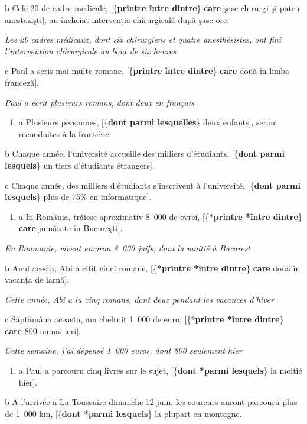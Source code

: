   b  Cele 20 de cadre medicale, [\{\textbf{printre {\textbar} între {\textbar} dintre}\} \textbf{care} şase chirurgi şi patru anestezişti], au încheiat intervenția chirurgicală după şase ore.

{\itshape
Les 20 cadres médicaux, dont six chirurgiens et quatre anesthésistes, ont fini l'intervention chirurgicale au bout de six heures}

  c  Paul a scris mai multe romane, [\{\textbf{printre {\textbar} între {\textbar} dintre}\} \textbf{care} două în limba franceză].

{\itshape
Paul a écrit plusieurs romans, dont deux en français}


\begin{enumerate}
\item \label{bkm:Ref295319097}a  Plusieurs personnes, [\{\textbf{dont {\textbar} parmi lesquelles}\} deux enfants], seront reconduites à la frontière.


\end{enumerate}
  b  Chaque année, l'université accueille des milliers d'étudiants, [\{\textbf{dont {\textbar} parmi} \textbf{lesquels}\} un tiers d'étudiants étrangers].

  c  Chaque année, des milliers d'étudiants s'inscrivent à l'université, [\{\textbf{dont {\textbar} parmi} \textbf{lesquels}\} plus de 75\% en informatique]\emph{\textup{.} }


\begin{enumerate}
\item \label{bkm:Ref295319065}a  In România, trăiesc aproximativ 8~000 de evrei, [\{\textbf{*printre {\textbar} *între {\textbar} dintre}\}\textbf{ care} jumătate în Bucureşti].  


\end{enumerate}
{\itshape
En Roumanie, vivent environ 8~000 juifs, dont la moitié à Bucarest}

  b  Anul acesta, Abi a citit cinci romane, [\{\textbf{*printre {\textbar} *între {\textbar} dintre}\} \textbf{care} două în vacanța de iarnă].

{\itshape
Cette année, Abi a lu cinq romans, dont deux pendant les vacances d'hiver}

  c  Săptămâna aceasta, am cheltuit 1~000 de euro, [\{*\textbf{printre {\textbar} *între {\textbar} dintre}\} \textbf{care} 800 numai ieri].

    \textit{Cette semaine, j'ai dépensé 1~000 euros, dont 800 seulement hier}


\begin{enumerate}
\item \label{bkm:Ref295319101}a  Paul a parcouru cinq livres sur le sujet, [\{\textbf{dont {\textbar} *parmi lesquels}\} la moitié hier]. 


\end{enumerate}
  b  A l'arrivée à La Toussuire dimanche 12 juin, les coureurs auront parcouru plus de 1~000 km, [\{\textbf{dont {\textbar} *parmi lesquels}\} la plupart en montagne.

